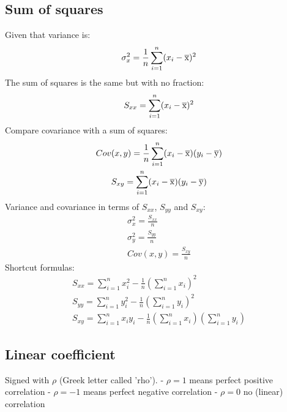 \documentclass{article}
\begin{document}
\subsection{Sum of squares}
Given that variance is:
\begin{equation}
  \sigma^2_x = \frac{1}{n} \sum_{i=1}^n(x_i - \overline{\rm x})^2
\end{equation}
The sum of squares is the same but with no fraction:
\begin{equation}
  S_{xx} = \sum_{i=1}^n(x_i - \overline{\rm x})^2
\end{equation}
Compare covariance with a sum of squares:
\begin{equation}
  \begin{gathered}
    Cov(x,y) = \frac{1}{n} \sum_{i=1}^n(x_i - \overline{\rm x})(y_i - \overline{\rm y}) \\
    S_{xy} = \sum_{i=1}^n(x_i - \overline{\rm x})(y_i - \overline{\rm y})
  \end{gathered}
\end{equation}
Variance and covariance in terms of $S_{xx}$, $S_{yy}$ and $S_{xy}$:
\begin{equation}
  \begin{gathered}
    \sigma^2_x = \frac{S_{xx}}{n} \\
    \sigma^2_y = \frac{S_{yy}}{n} \\
    Cov(x,y) = \frac{S_{xy}}{n}
  \end{gathered}
\end{equation}
Shortcut formulas:
\begin{equation}
  \begin{gathered}
    S_{xx} = \sum_{i=1}^n x_i^2 - \frac{1}{n} (\sum_{i=1}^n x_i)^2 \\
    S_{yy} = \sum_{i=1}^n y_i^2 - \frac{1}{n} (\sum_{i=1}^n y_i)^2 \\
    S_{xy} = \sum_{i=1}^n x_iy_i - \frac{1}{n} (\sum_{i=1}^n x_i)(\sum_{i=1}^n y_i)
  \end{gathered}
\end{equation}
\subsection{Linear coefficient}
Signed with $\rho$ (Greek letter called 'rho').
- $\rho = 1$ means perfect positive correlation
- $\rho = -1$ means perfect negative correlation
- $\rho = 0$ no (linear) correlation
\end{document}
